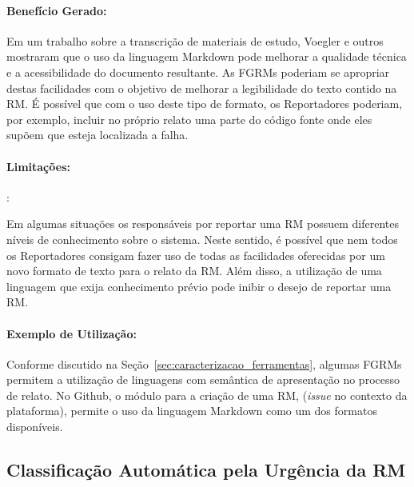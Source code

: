 \paragraph{Benefício Gerado:}\label{par:papéis_afetados_s06}

Em um trabalho sobre a transcrição de materiais de estudo, Voegler e
outros~\cite{voegler2014markdown} mostraram que o uso da linguagem Markdown
pode melhorar a qualidade técnica e a acessibilidade do documento resultante.
As FGRMs poderiam se apropriar destas facilidades com o objetivo de melhorar a
legibilidade do texto contido na RM\@. É possível que com o uso deste tipo de
formato, os Reportadores poderiam, por exemplo, incluir no próprio relato uma
parte do código fonte onde eles supõem que esteja localizada a falha.

\paragraph{Limitações:}:\label{par:limitacoes_s06}

Em algumas situações os responsáveis por reportar uma RM possuem diferentes
níveis de conhecimento sobre o sistema. Neste sentido, é possível que nem todos
os Reportadores consigam fazer uso de todas as facilidades oferecidas por um
novo formato de texto para o relato da RM\@. Além disso, a utilização de uma
linguagem que exija conhecimento prévio pode inibir o desejo de reportar uma
RM\@.

\paragraph{Exemplo de Utilização:}
\label{par:exemplo_de_utilização_s06}

Conforme discutido na Seção~\ref{sec:caracterizacao_ferramentas}, algumas FGRMs
permitem a utilização de linguagens com semântica de apresentação no processo de
relato. No Github, o módulo para a criação de uma RM, (\textit{issue} no
contexto da plataforma), permite o uso da linguagem Markdown como um dos
formatos disponíveis.

\subsection{Classificação Automática pela Urgência da RM}
\label{sub:priorizacao_automatica_rms}


